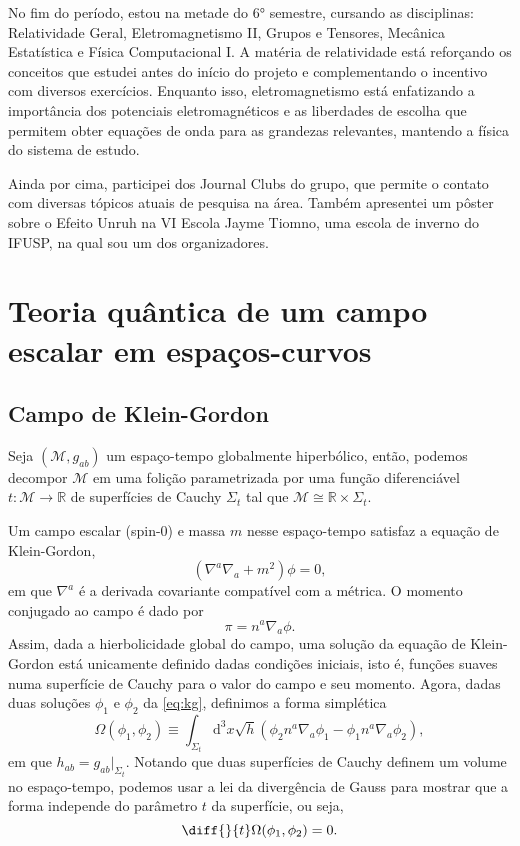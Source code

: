 \documentclass[12pt]{article}
\newcommand{\m}{\mathcal{M}}
\newcommand{\kg}{\left(\nabla^a\nabla_a+m^2\right)}
\newcommand{\dd}{\mathrm{d}}
\begin{document}
No fim do período, estou na metade do 6° semestre, cursando as disciplinas: Relatividade Geral, Eletromagnetismo II, Grupos e Tensores, Mecânica Estatística e Física Computacional I. A matéria de relatividade está reforçando os conceitos que estudei antes do início do projeto e complementando o incentivo com diversos exercícios. Enquanto isso, eletromagnetismo está enfatizando a importância dos potenciais eletromagnéticos e as liberdades de escolha que permitem obter equações de onda para as grandezas relevantes, mantendo a física do sistema de estudo.

Ainda por cima, participei dos Journal Clubs do grupo, que permite o contato com diversas tópicos atuais de pesquisa na área. Também apresentei um pôster sobre o Efeito Unruh na VI Escola Jayme Tiomno, uma escola de inverno do IFUSP, na qual sou um dos organizadores.

\section{Teoria quântica de um campo escalar em espaços-curvos}
\subsection*{Campo de Klein-Gordon}
Seja \((\m,g_{ab})\) um espaço-tempo globalmente hiperbólico, então, podemos decompor \(\m\) em uma folição parametrizada por uma função diferenciável \(t:\m\to\mathbb{R}\) de superfícies de Cauchy \(\Sigma_t\) tal que \(\m\cong\mathbb{R}\times\Sigma_t\).

Um campo escalar (spin-0) e massa \(m\) nesse espaço-tempo satisfaz a equação de Klein-Gordon,
\begin{equation}
    \kg\phi=0,
    \label{eq:kg}
\end{equation}
em que \(\nabla^a\) é a derivada covariante compatível com a métrica. O momento conjugado ao campo é dado por
\begin{equation}
    \pi=n^a\nabla_a\phi.
\end{equation}
Assim, dada a hierbolicidade global do campo, uma solução da equação de Klein-Gordon está unicamente definido dadas condições iniciais, isto é, funções suaves numa superfície de Cauchy para o valor do campo e seu momento.
Agora, dadas duas soluções \(\phi_1\) e \(\phi_2\) da \cref{eq:kg}, definimos a forma simplética
\begin{equation}
    \Omega(\phi_1,\phi_2)\equiv\int_{\Sigma_t}\dd^3x\sqrt{h}\left(\phi_2n^a\nabla_a\phi_1-\phi_1n^a\nabla_a\phi_2\right),
\end{equation}
em que \(h_{ab}=g_{ab}\vert_{\Sigma_t}\). Notando que duas superfícies de Cauchy definem um volume no espaço-tempo, podemos usar a lei da divergência de Gauss para mostrar que a forma independe do parâmetro \(t\) da superfície, ou seja,
\begin{equation}
    \diff{}{t}\Omega(\phi_1,\phi_2)=0.
\end{equation}
\end{document}
